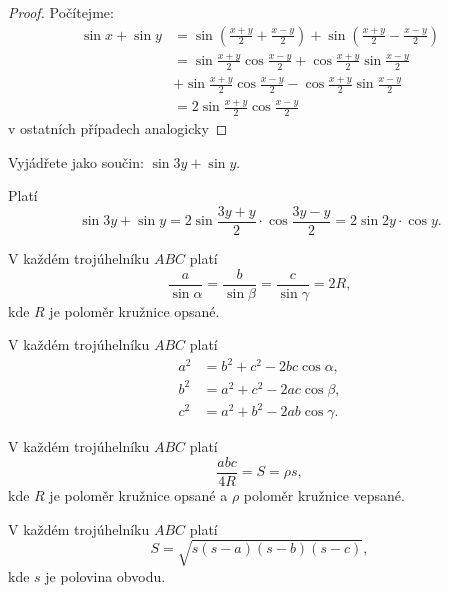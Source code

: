 \begin{proof}
    Počítejme:
    \begin{align*}
        \sin x + \sin y & = \sin \left(\frac{x+y}{2}+\frac{x-y}{2}\right)+ \sin \left(\frac{x+y}{2}-\frac{x-y}{2}\right ) \\
        & = \sin \frac{x+y}{2} \cos\frac{x-y}{2} + \cos\frac{x+y}{2} \sin \frac{x-y}{2} \\
        & + \sin \frac{x+y}{2} \cos\frac{x-y}{2} -  \cos\frac{x+y}{2} \sin \frac{x-y}{2}\\
        & = 2\sin \frac{x+y}{2} \cos\frac{x-y}{2}
    \end{align*}
  v ostatních případech analogicky
\end{proof}

\begin{priklad}
Vyjádřete jako součin: $\sin 3y+\sin y.$
\end{priklad}

\begin{reseni}
Platí
$$\sin 3y+\sin y=2\sin \frac{3y+y}{2}\cdot \cos \frac{3y-y}{2}=2\sin 2y \cdot \cos y.$$
\end{reseni}

\begin{veta}
    V každém trojúhelníku $ABC$ platí
    $$\frac{a}{\sin \alpha} = \frac{b}{\sin \beta}=\frac{c}{\sin \gamma}=2R,$$
    kde $R$ je poloměr kružnice opsané.
\end{veta}

\begin{veta}
 V každém trojúhelníku $ABC$ platí
 \begin{align*}
    a^2 &= b^2+c^2-2bc\cos \alpha, \\
    b^2 &= a^2+c^2-2ac\cos \beta ,\\
    c^2 &= a^2+b^2-2ab\cos \gamma.
 \end{align*}
\end{veta}

\begin{veta}\label{obsahtroj}
     V každém trojúhelníku $ABC$ platí
     $$\frac{abc}{4R}=S=\rho s,$$
     kde $R$ je poloměr kružnice opsané a $\rho$ poloměr kružnice vepsané.
\end{veta}

\begin{veta}
    V každém trojúhelníku $ABC$ platí
    $$S=\sqrt{s(s-a)(s-b)(s-c)}, $$
    kde $s$ je polovina obvodu.
\end{veta}

